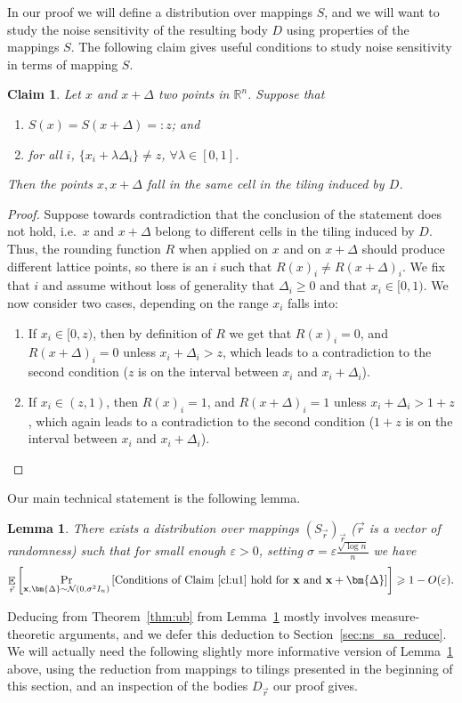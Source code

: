 \documentclass[10pt,a4paper]{article}
\newtheorem{lemma}[thm]{Lemma}
\newtheorem{claim}[thm]{Claim}
\newcommand\Prob[2]{{\Pr_{#1}\left[ {#2} \right]}}
\newcommand\Expect[2]{{\mathop{\mathbb{E}}_{#1}\left[ {#2} \right]}}
\newcommand\eps{\varepsilon}
\renewcommand\geq{\geqslant}
\renewcommand\ge{\geqslant}
\newcommand{\RR}{\mathbb{R}}
\newcommand{\la}{\lambda}
\newcommand{\De}{\Delta}
\begin{document}
In our proof we will define a distribution over mappings $S$, and we will want to study
the noise sensitivity of the resulting body $D$ using properties of the mappings $S$.
The following claim gives useful conditions to study noise sensitivity in terms of
mapping $S$.
\begin{claim}\label{cl:u1}
	Let $x$ and $x+\De$ two points in $\RR^n$. Suppose that
	\begin{enumerate}
		\item
		$S(x)=S(x+\De)=:z$; and
		\item
		for all $i$, $\{x_i+\la \De_i\} \neq z$, $\forall \la\in [0,1]$.
	\end{enumerate}
Then the points $x,x+\De$ fall in the same cell in the tiling induced by $D$.
\end{claim}
\begin{proof}
Suppose towards contradiction that the conclusion of the statement does not hold, i.e.\
$x$ and $x+\De$ belong to different cells in the tiling induced by $D$.
Thus, the rounding function $R$ when applied on $x$ and on $x+\De$ should produce
different lattice points, so there is an $i$ such that $R(x)_i \neq R(x+\De)_i$. We fix that $i$ and
assume without loss of generality that $\De_i\ge 0$ and that $x_i\in [0,1)$. We now consider two cases,
depending on the range $x_i$ falls into:
\begin{enumerate}
  \item If $x_i \in [0,z)$, then by definition of $R$ we get that
  $R(x)_i=0$, and $R(x+\De)_i=0$ unless $x_i+\De_i >z$, which leads to a contradiction to the second condition ($z$ is on the interval between $x_i$ and $x_i+\De_i$).
  \item 	If $x_i \in (z,1)$, then $R(x)_i=1$, and  $R(x+\De)_i=1$ unless $x_i+\De_i >1+z$, which again leads  to a contradiction to the second condition ($1+z$ is on the interval between $x_i$ and $x_i+\De_i$).\qedhere
\end{enumerate}
\end{proof}

Our main technical statement is the following lemma.
\begin{lemma}\label{lem:main_ub}
  There exists a distribution over mappings $(S_{\vec{r}})_{\vec{r}}$ ($\vec{r}$ is a vector
  of randomness) such that for small enough $\eps>0$, setting $\sigma = \eps\frac{\sqrt{\log n}}{n}$ we have
\[
\Expect{\vec{r}}{\Prob{{\bf x}, \bm{\De}\sim\mathcal{N}(0,\sigma^2 I_n)}{\text{Conditions of Claim~\ref{cl:u1} hold for ${\bf x}$ and ${\bf x}+\bm{\De}$}}}
\geq 1 - O(\eps).
\]
\end{lemma}
Deducing from Theorem~\ref{thm:ub} from Lemma~\ref{lem:main_ub} mostly involves measure-theoretic arguments,
and we defer this deduction to Section~\ref{sec:ns_sa_reduce}. We will actually need the following slightly
more informative version of Lemma~\ref{lem:main_ub} above, using the reduction from
mappings to tilings presented in the beginning of this section, and an inspection of the
bodies $D_{\vec{r}}$ our proof gives.
\end{document}
